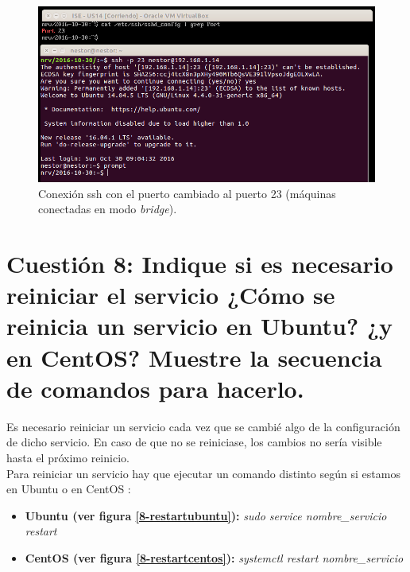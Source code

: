 \documentclass[a4paper,titlepage,12pt]{scrartcl}	%
\numberwithin{figure}{section} %
\numberwithin{table}{section} %
\begin{document}
	\begin{figure}[H]
		\includegraphics[width=\linewidth]{./Imagenes/7-puerto.png}
		\vspace{-0.5cm}
		\caption[Conexión ssh con el puerto cambiado al puerto 23 (máquinas conectadas en modo \textit{bridge}).]{Conexión ssh con el puerto cambiado al puerto 23 (máquinas conectadas en modo \textit{bridge}).}
		\label{7-puerto}
	\end{figure}
	
	\section[Cuestión 8: Indique si es necesario reiniciar el servicio ¿Cómo se reinicia un servicio en Ubuntu? ¿y en CentOS? Muestre la secuencia de comandos para hacerlo.]{Cuestión 8: Indique si es necesario reiniciar el servicio ¿Cómo se reinicia un servicio en Ubuntu? ¿y en CentOS? Muestre la secuencia de comandos para hacerlo.}
	
	Es necesario reiniciar un servicio cada vez que se cambié algo de la configuración de dicho servicio. En caso de que no se reiniciase, los cambios no sería visible hasta el próximo reinicio. \\
	
	Para reiniciar un servicio hay que ejecutar un comando distinto según si estamos en Ubuntu \cite{restartUbuntu} o en CentOS \cite{restartcentos}:
	\begin{itemize}
		\item \textbf{Ubuntu (ver figura \ref{8-restartubuntu}):} \textit{sudo service nombre\_servicio restart}
		\item \textbf{CentOS (ver figura \ref{8-restartcentos}):} \textit{systemctl restart nombre\_servicio}
	\end{itemize}
	
\end{document}
